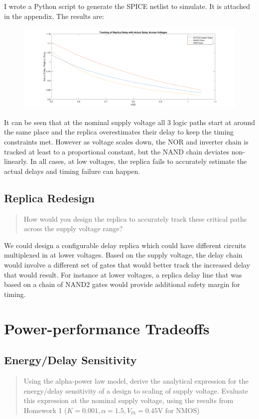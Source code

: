 \documentclass[11pt]{article}
\begin{document}
I wrote a Python script to generate the SPICE netlist to simulate. It is attached in the appendix. The results are:

\begin{figure}[H]
	\centerline{\includegraphics[width=\textwidth]{images/replica_tracking.png}}
\end{figure}

It can be seen that at the nominal supply voltage all 3 logic paths start at around the same place and the replica overestimates their delay to keep the timing constraints met. However as voltage scales down, the NOR and inverter chain is tracked at least to a proportional constant, but the NAND chain deviates non-linearly. In all cases, at low voltages, the replica fails to accurately estimate the actual delays and timing failure can happen.

\subsection{Replica Redesign}
\begin{quote}
	How would you design the replica to accurately track these critical paths across the supply voltage range?
\end{quote}

We could design a configurable delay replica which could have different circuits multiplexed in at lower voltages. Based on the supply voltage, the delay chain would involve a different set of gates that would better track the increased delay that would result. For instance at lower voltages, a replica delay line that was based on a chain of NAND2 gates would provide additional safety margin for timing.

\section{Power-performance Tradeoffs}

\subsection{Energy/Delay Sensitivity}
\begin{quote}
	Using the alpha-power law model, derive the analytical expression for the energy/delay sensitivity of a design to scaling of supply voltage. Evaluate this expression at the nominal supply voltage, using the results from Homework 1 ($K = 0.001, \alpha = 1.5, V_{th} = 0.45 \text{V for NMOS}$)
\end{quote}
\end{document}
